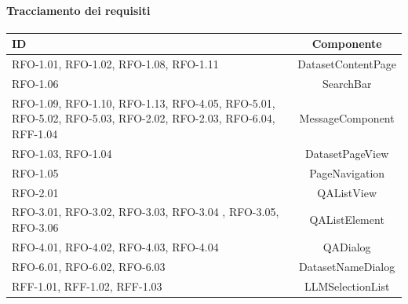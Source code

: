\paragraph{Tracciamento dei requisiti}
\begin{tabularx}{\textwidth}{|X|c|}
    \hline
    \textbf{ID} & \textbf{Componente} \\
    \hline
        RFO-1.01, RFO-1.02, RFO-1.08, RFO-1.11  & DatasetContentPage\\
    \hline
        RFO-1.06 & SearchBar\\
    \hline
        RFO-1.09, RFO-1.10, RFO-1.13, RFO-4.05, RFO-5.01, RFO-5.02, RFO-5.03, RFO-2.02, RFO-2.03, RFO-6.04, RFF-1.04 & MessageComponent\\
    \hline
        RFO-1.03, RFO-1.04 & DatasetPageView \\
    \hline
        RFO-1.05 & PageNavigation\\
    \hline
        RFO-2.01& QAListView\\
    \hline
        RFO-3.01, RFO-3.02, RFO-3.03, RFO-3.04 , RFO-3.05, RFO-3.06 & QAListElement\\
    \hline
        RFO-4.01, RFO-4.02, RFO-4.03, RFO-4.04& QADialog\\
    \hline
        RFO-6.01, RFO-6.02, RFO-6.03 & DatasetNameDialog \\
    \hline
        RFF-1.01, RFF-1.02, RFF-1.03 & LLMSelectionList \\
    \hline
\end{tabularx}